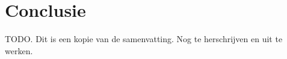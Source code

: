 
\chapter{Conclusie}%
\label{ch:conclusie}


TODO. Dit is een kopie van de samenvatting. Nog te herschrijven en uit te werken.

